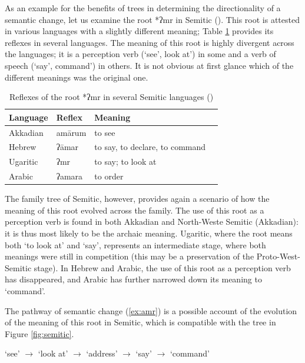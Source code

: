 \documentclass[svgnames,12pt]{scrartcl}
\newcommand{\ipa}[1]{{{\phon\mbox{#1}}}}
\begin{document}
{{As an example for the benefits of trees in determining the directionality of a semantic change, let
us examine the root *\ipa{ʔmr} in Semitic (\citealt[233;331;544]{kogan15semitic}). This root is
attested in various languages with a slightly different meaning; Table \ref{tab:amr} provides its
reflexes in several languages. The meaning of this root is highly divergent across the languages; it
is a perception verb (`see',  look at') in some and a verb of speech (`say',  command') in others.
It is not obvious at first glance which of the different meanings was the original one.

\begin{table}[h]
\caption{Reflexes of the root *\ipa{ʔmr} in several Semitic languages (\citealt[233;331;544]{kogan15semitic})} \centering \label{tab:amr}
\begin{tabular}{llll}
\toprule
Language & Reflex & Meaning \\
\midrule
Akkadian & \ipa{amārum} & to see \\
Hebrew & \ipa{ʔāmar} & to say, to declare, to command \\
Ugaritic & \ipa{ʔmr} & to say; to look at \\
Arabic & \ipa{ʔamara} & to order \\
\bottomrule
\end{tabular}
\end{table}
 
The family tree of Semitic, however, provides again a scenario of how the meaning of this root
evolved across the family. The use of this root as a perception verb is found in both Akkadian and
North-Weste Semitic (Akkadian): it is thus most likely to be the archaic meaning. Ugaritic, where
the root means both `to look at' and `say', represents an intermediate stage, where both meanings
were still in competition (this may be a preservation of the Proto-West-Semitic stage). In Hebrew
and Arabic, the use of this root as a perception verb has disappeared, and Arabic has further
narrowed down its meaning to `command'.

The pathway of semantic change (\ref{ex:amr}) is a possible account of the evolution of the meaning
of this root in Semitic, which is compatible with the tree in Figure \ref{fig:semitic}.

\begin{exe}
\ex \label{ex:amr}
\glt `see' $\rightarrow$ `look at' $\rightarrow$ `address' $\rightarrow$ `say' $\rightarrow$ `command'
\end{exe}

}}
\end{document}
